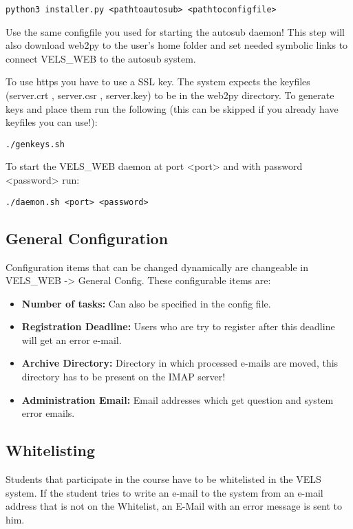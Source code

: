 \begin{verbatim}
python3 installer.py <pathtoautosub> <pathtoconfigfile>
\end{verbatim}
Use the same configfile you used for starting the autosub daemon! This step will
also download web2py to the user's home folder and set needed symbolic links to 
connect VELS\_WEB to the autosub system.

To use https you have to use a SSL key. The system expects the keyfiles
(server.crt , server.csr , server.key) to be in the web2py directory. To
generate keys and place them run the following (this can be skipped if you 
already have keyfiles you can use!):

\begin{verbatim}
./genkeys.sh    
\end{verbatim}

To start the VELS\_WEB daemon at port <port> and with password <password> run:
\begin{verbatim}
./daemon.sh <port> <password> 
\end{verbatim}

\subsection{General Configuration}\label{sub:generalconfig}
Configuration items that can be changed dynamically are changeable in VELS\_WEB ->
General Config. These configurable items are:
\begin{itemize}
\item {\bf Number of tasks: }Can also be specified in the config file.
\item {\bf Registration Deadline: } Users who are try to register after this deadline will
    get an error e-mail.
\item {\bf Archive Directory: } Directory in which processed e-mails are moved, this
    directory has to be present on the IMAP server!
\item {\bf Administration Email: } Email addresses which get question and system error emails.

\end{itemize}

\subsection{Whitelisting} \label{sub:whitelisting}
Students that participate in the course have to be whitelisted in the VELS system. If the student
tries to write an e-mail to the system from an e-mail address that is not on the Whitelist, an E-Mail
with an error message is sent to him.

